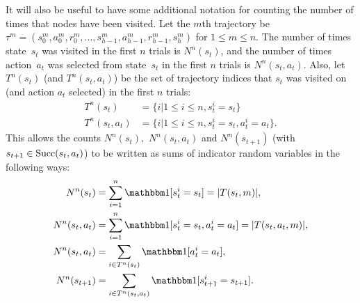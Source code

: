     It will also be useful to have some additional notation for counting the number of times that nodes have been visited. Let the $m$th trajectory be $\tau^m=(s_0^m,a_0^m,r_0^m,...,s_{h-1}^m,a_{h-1}^m,r_{h-1}^m,s_{h}^m)$ for $1\leq m \leq n$. The number of times state~$s_t$ was visited in the first $n$ trials is $N^n(s_t)$, and the number of times action~$a_t$ was selected from state~$s_t$ in the first $n$ trials is $N^n(s_t,a_t)$.  Also, let $T^n(s_t)$ (and $T^n(s_t,a_t)$) be the set of trajectory indices that $s_t$ was visited on (and action $a_t$ selected) in the first $n$ trials: 
    \begin{align}
        T^n(s_t) &= \{i | 1\leq i\leq n, s^i_t = s_t \} \\
        T^n(s_t,a_t) &= \{i | 1\leq i\leq n, s^i_t = s_t, a^i_t = a_t \}.
    \end{align}
    This allows the counts $N^n(s_t),$ $N^n(s_t,a_t)$ and $N^n(s_{t+1})$ (with $s_{t+1}\in{\textnormal{Succ}(s_t,a_t)}$) to be written as sums of indicator random variables in the following ways:
    \begin{align}
        N^n(s_t) &= \sum_{i=1}^n \one[s^i_t=s_t] = |T(s_t,m)|, \\
        N^n(s_t,a_t) &= \sum_{i=1}^n \one[s^i_t=s_t,a^i_t=a_t] = |T(s_t,a_t,m)|, \\ 
        N^n(s_t,a_t) &= \sum_{i\in T^n(s_t)} \one[a^i_t = a_t], \label{appeq:nsa_sum} \\
        N^n(s_{t+1}) &= \sum_{i\in T^n(s_t,a_t)} \one[s^i_{t+1} = s_{t+1}]. \label{appeq:ns_sum}
    \end{align}

